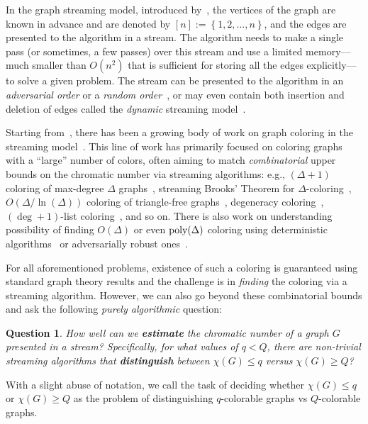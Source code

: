 \documentclass[11pt]{article}
\newtheorem{question}{Question}
\theoremstyle{definition}
\renewcommand{\leq}{\leqslant}
\renewcommand{\geq}{\geqslant}
\newcommand{\set}[1]{\ensuremath{\left\{ #1 \right\}}}
\newcommand{\poly}{\mbox{\rm poly}}
\begin{document}
In the graph streaming model, introduced by~\cite{FeigenbaumKMSZ04}, the vertices of the graph are known in advance and are denoted by $[n] := \set{1,2,\ldots,n}$, and 
the edges are presented to the algorithm in a stream. The algorithm needs to make a single pass (or sometimes, a few passes) over this stream and use a limited memory---much smaller than $O(n^2)$ that is sufficient for storing
all the edges explicitly---to solve a given problem. The stream can be presented to the algorithm in an \emph{adversarial order} or a \emph{random order}~\cite{McGregor14}, or may even contain both insertion and deletion of edges called 
the \emph{dynamic} streaming model~\cite{AhnGM12}. 

Starting from~\cite{BeraG18,AssadiCK19a}, there has been 
a growing body of work on graph coloring in the streaming model~\cite{CormodeDK19,BeraCG20,AlonA20,BhattacharyaBMU21,AssadiKM22,HalldorssonKNT22,AssadiCS22,ChakrabartiGS22,AssadiCGS23,FlinGHKN24}. This line of work has primarily focused on coloring graphs with a ``large'' number of colors, often
aiming to match \emph{combinatorial} upper bounds on the chromatic number via streaming algorithms: e.g., $(\Delta+1)$ coloring of max-degree $\Delta$ graphs~\cite{AssadiCK19a,AssadiY25}, streaming Brooks' Theorem for $\Delta$-coloring~\cite{AssadiKM22}, $O(\Delta/\ln(\Delta))$ coloring of triangle-free graphs~\cite{AlonA20}, degeneracy coloring~\cite{BeraCG20}, $(\deg+1)$-list coloring~\cite{HalldorssonKNT22}, and so on. 
There is also work on understanding possibility of finding $O(\Delta)$ or even $\poly(\Delta)$ coloring using deterministic algorithms~\cite{AssadiCS22} or adversarially robust ones~\cite{ChakrabartiGS22,AssadiCGS23}. 

For all aforementioned problems, 
existence of such a coloring is guaranteed using standard graph theory results and the challenge is in \emph{finding} the coloring via a streaming algorithm. 
However, we can also go beyond these combinatorial bounds and ask the following \emph{purely algorithmic} question: 
\begin{question}\label{question}
	How well can we \textbf{estimate} the chromatic number of a graph $G$ presented in a stream? Specifically, for what values of $q < Q$, there are non-trivial
	streaming algorithms that \textbf{distinguish} between $\chi(G) \leq q$ versus $\chi(G) \geq Q$?
\end{question}

With a slight abuse of notation, we call the task of deciding whether $\chi(G)\leq q$ or $\chi(G)\geq Q$ as the problem of distinguishing $q$-colorable graphs vs $Q$-colorable graphs.
\end{document}
